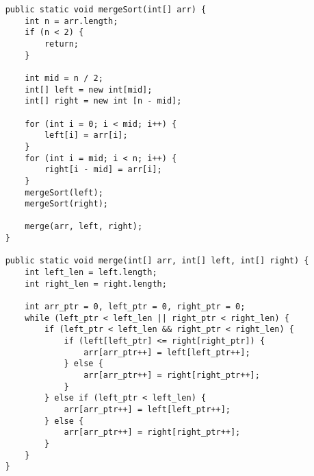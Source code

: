 \begin{solution}
\begin{lstlisting}
    public static void mergeSort(int[] arr) {
        int n = arr.length;
        if (n < 2) {
            return;
        }
        
        int mid = n / 2;
        int[] left = new int[mid];
        int[] right = new int [n - mid];

        for (int i = 0; i < mid; i++) {
            left[i] = arr[i];
        }
        for (int i = mid; i < n; i++) {
            right[i - mid] = arr[i];
        }
        mergeSort(left);
        mergeSort(right);

        merge(arr, left, right);
    }

    public static void merge(int[] arr, int[] left, int[] right) {
        int left_len = left.length;
        int right_len = right.length;

        int arr_ptr = 0, left_ptr = 0, right_ptr = 0;
        while (left_ptr < left_len || right_ptr < right_len) {
            if (left_ptr < left_len && right_ptr < right_len) {
                if (left[left_ptr] <= right[right_ptr]) {
                    arr[arr_ptr++] = left[left_ptr++];
                } else {
                    arr[arr_ptr++] = right[right_ptr++];
                }
            } else if (left_ptr < left_len) {
                arr[arr_ptr++] = left[left_ptr++];
            } else {
                arr[arr_ptr++] = right[right_ptr++];
            }
        }
    }
\end{lstlisting}
\end{solution}